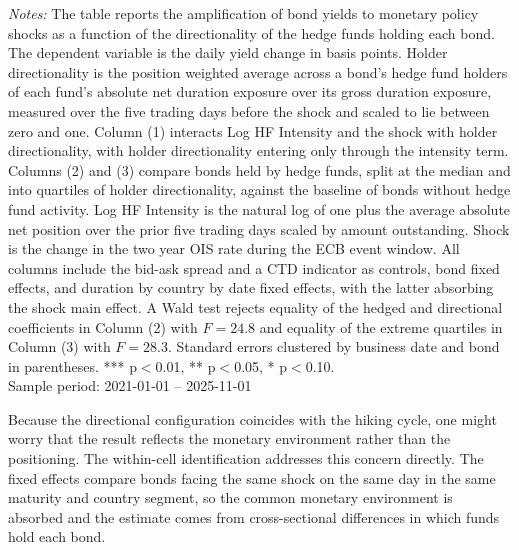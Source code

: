 \documentclass[english, 11pt, oneside]{article}
\begin{document}
\begin{table}[t]
\vspace{1ex}
\raggedright\scriptsize
\textit{Notes:} The table reports the amplification of bond yields to monetary policy shocks as a function of the directionality of the hedge funds holding each bond. The dependent variable is the daily yield change in basis points. Holder directionality is the position weighted average across a bond's hedge fund holders of each fund's absolute net duration exposure over its gross duration exposure, measured over the five trading days before the shock and scaled to lie between zero and one. Column (1) interacts Log HF Intensity and the shock with holder directionality, with holder directionality entering only through the intensity term. Columns (2) and (3) compare bonds held by hedge funds, split at the median and into quartiles of holder directionality, against the baseline of bonds without hedge fund activity. Log HF Intensity is the natural log of one plus the average absolute net position over the prior five trading days scaled by amount outstanding. Shock is the change in the two year OIS rate during the ECB event window. All columns include the bid-ask spread and a CTD indicator as controls, bond fixed effects, and duration by country by date fixed effects, with the latter absorbing the shock main effect. A Wald test rejects equality of the hedged and directional coefficients in Column (2) with $F=24.8$ and equality of the extreme quartiles in Column (3) with $F=28.3$. Standard errors clustered by business date and bond in parentheses. *** p$<$0.01, ** p$<$0.05, * p$<$0.10. \\ Sample period: 2021-01-01 -- 2025-11-01
\end{table}

Because the directional configuration coincides with the hiking cycle, one might worry that the result reflects the monetary environment rather than the positioning. The within-cell identification addresses this concern directly. The fixed effects compare bonds facing the same shock on the same day in the same maturity and country segment, so the common monetary environment is absorbed and the estimate comes from cross-sectional differences in which funds hold each bond.
\end{document}
